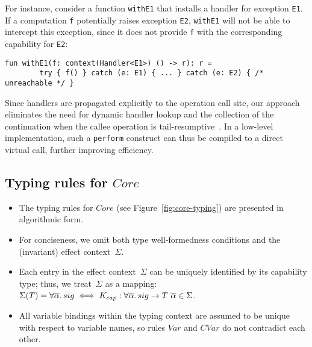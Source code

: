 \documentclass[acmsmall,review,screen]{acmart}
\newcommand{\ap}{~}
\begin{document}
For instance, consider a function \texttt{withE1} that installs a handler for exception \texttt{E1}.
If a computation \texttt{f} potentially raises exception \texttt{E2}, \texttt{withE1} will not be able to intercept this exception, since it does not provide \texttt{f} with the corresponding capability for \texttt{E2}:
\begin{lstlisting}[language=colang]
    fun withE1(f: context(Handler<E1>) () -> r): r =
        try { f() } catch (e: E1) { ... } catch (e: E2) { /* unreachable */ }
\end{lstlisting}

Since handlers are propagated explicitly to the operation call site, our approach eliminates the need for dynamic handler lookup and the collection of the continuation when the callee operation is tail-resumptive~\cite{xie2020effect}.
In a low-level implementation, such a \texttt{perform} construct can thus be compiled to a direct virtual call, further improving efficiency. %


\subsection{Typing rules for $Core$} \label{subsec:core-typing}

\begin{itemize}
    \item The typing rules for $Core$ (see Figure~\ref{fig:core-typing}) are presented in algorithmic form.
    \item For conciseness, we omit both type well-formedness conditions and the (invariant) effect context~$\Sigma$.
    \item Each entry in the effect context~$\Sigma$ can be uniquely identified by its capability type; thus, we treat~$\Sigma$ as a mapping: $\Sigma(T) = \forall\overline{\alpha}\ldotp sig \iff K_{cap} : \forall\overline{\alpha}\ldotp sig\to T\ap\overline{\alpha}\in\Sigma$.
    \item All variable bindings within the typing context are assumed to be unique with respect to variable names, so rules $Var$ and $CVar$ do not contradict each other.
\end{itemize}
\end{document}
